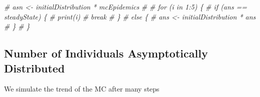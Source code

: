 \documentclass[
]{article}
\newenvironment{Shaded}{\begin{snugshade}}{\end{snugshade}}
\newcommand{\CommentTok}[1]{\textcolor[rgb]{0.56,0.35,0.01}{\textit{#1}}}
\begin{document}
\begin{Shaded}
\begin{Highlighting}[]
\CommentTok{# asn <- initialDistribution * mcEpidemics}
\CommentTok{# }
\CommentTok{# for (i in 1:5) \{}
\CommentTok{#   if (ans == steadyState) \{}
\CommentTok{#     print(i)}
\CommentTok{#     break}
\CommentTok{#   \}}
\CommentTok{#   else \{}
\CommentTok{#     ans <- initialDistribution * ans}
\CommentTok{#   \}}
\CommentTok{# \}}
\end{Highlighting}
\end{Shaded}

\hypertarget{number-of-individuals-asymptotically-distributed}{%
\subsection{Number of Individuals Asymptotically
Distributed}\label{number-of-individuals-asymptotically-distributed}}

We simulate the trend of the MC after many steps
\end{document}
